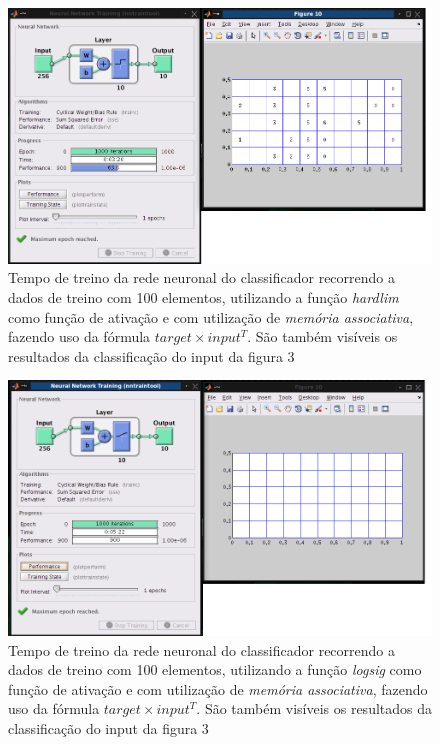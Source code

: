 \documentclass{article}
\begin{document}
\begin{figure}[h]
  \centering
      \includegraphics[scale=0.3]{100_Transpose_Hadlim.png}
  \caption{Tempo de treino da rede neuronal do classificador recorrendo a dados de treino com 100 elementos, utilizando a função \emph{hardlim} como função de ativação e com utilização de \emph{memória associativa}, fazendo uso da fórmula $target\times input^T$. São também visíveis os resultados da classificação do input da figura 3}
\end{figure}

\begin{figure}[h]
  \centering
      \includegraphics[scale=0.3]{100_Transpose_Sigmoidal.png}
  \caption{Tempo de treino da rede neuronal do classificador recorrendo a dados de treino com 100 elementos, utilizando a função \emph{logsig} como função de ativação e com utilização de \emph{memória associativa}, fazendo uso da fórmula $target\times input^T$. São também visíveis os resultados da classificação do input da figura 3}
\end{figure}
\end{document}
